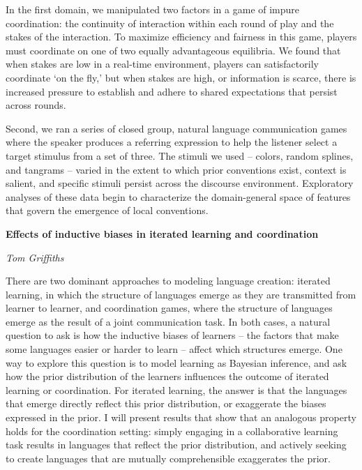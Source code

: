 \documentclass[10pt,letterpaper]{article}
\begin{document}
In the first domain, we manipulated two factors in a game of impure coordination: the continuity of interaction within each round of play and the stakes of the interaction. To maximize efficiency and fairness in this game, players must coordinate on one of two equally advantageous equilibria. We found that when stakes are low in a real-time environment, players can satisfactorily coordinate `on the fly,' but when stakes are high, or information is scarce, there is increased pressure to establish and adhere to shared expectations that persist across rounds. 

Second, we ran a series of closed group, natural language communication games where the speaker produces a referring expression to help the listener select a target stimulus from a set of three. The stimuli we used -- colors, random splines, and tangrams -- varied in the extent to which prior conventions exist, context is salient, and specific stimuli persist across the discourse environment. Exploratory analyses of these data begin to characterize the domain-general space of features that govern the emergence of local conventions.
\vspace{2cm}

\begin{center}\textbf{Effects of inductive biases in iterated learning and coordination}\end{center}
\begin{center}\emph{Tom Griffiths}\end{center}

There are two dominant approaches to modeling language creation: iterated learning, in which the structure of languages emerge as they are transmitted from learner to learner, and coordination games, where the structure of languages emerge as the result of a joint communication task. In both cases, a natural question to ask is how the inductive biases of learners -- the factors that make some languages easier or harder to learn -- affect which structures emerge. One way to explore this question is to model learning as Bayesian inference, and ask how the prior distribution of the learners influences the outcome of iterated learning or coordination. For iterated learning, the answer is that the languages that emerge directly reflect this prior distribution, or exaggerate the biases expressed in the prior. I will present results that show that an analogous property holds for the coordination setting: simply engaging in a collaborative learning task results in languages that reflect the prior distribution, and actively seeking to create languages that are mutually comprehensible exaggerates the prior.



\setlength{\bibleftmargin}{.125in}
\setlength{\bibindent}{-\bibleftmargin}


\end{document}
